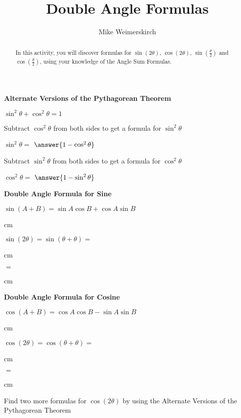 \documentclass[numbers]{ximera}
\title{Double Angle Formulas}
\author{Mike Weimerskirch}
\begin{document}
\begin{abstract}
  In this activity, you will discover formulas for $\sin (2\theta)$, $\cos (2\theta)$, $\sin \left(\frac{\theta}{2}\right)$ and $\cos \left(\frac{\theta}{2}\right)$, using your knowledge of the Angle Sum Formulas.
\end{abstract}

\maketitle


{\bf {Alternate Versions of the Pythagorean Theorem}}

\bigskip

$\sin^2 \theta + \cos^2 \theta = 1$

\bigskip

Subtract $\cos^2 \theta$ from both sides to get a formula for $\sin^2 \theta$ 
\begin{question}
  $\sin^2 \theta =$ 
  $\answer{1-\cos^2 \theta} $
\end{question}

Subtract $\sin^2 \theta$ from both sides to get a formula for $\cos^2 \theta$ 
\begin{question}
  $\cos^2\theta = $
  $\answer{1-\sin^2\theta}$
\end{question}



\vfill

{\bf {Double Angle Formula for Sine}}

\bigskip

$\sin (A+B) = \sin A \cos B + \cos A \sin B$

 cm

$\sin (2 \theta) = \sin (\theta + \theta) = $

 cm

$= $

 cm

\vfill

{\bf {Double Angle Formula for Cosine}}

\bigskip

$\cos (A+B) = \cos A \cos B - \sin A \sin B$

 cm

$\cos (2 \theta) = \cos (\theta + \theta) = $

 cm

$= $

 cm

Find two more formulas for $\cos (2\theta)$ by using the Alternate Versions of the Pythagorean Theorem
\end{document}

